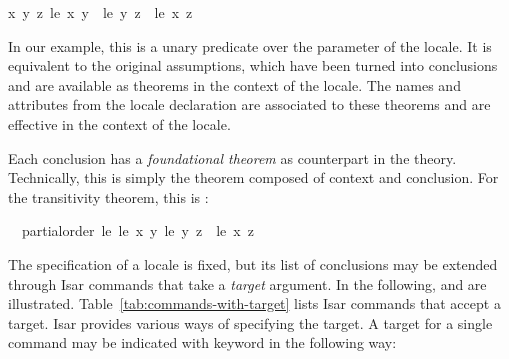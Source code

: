 \begin{isabellebody}
\begin{isamarkuptext}
\begin{isabelle}
x\ y\ z{}\ {}le\ x\ y\ {}\ {}le\ y\ z\ {}\ {}le\ x\ z{}%
\end{isabelle}
  In our example, this is a unary predicate over the parameter of the
  locale.  It is equivalent to the original assumptions, which have
  been turned into conclusions and are
  available as theorems in the context of the locale.  The names and
  attributes from the locale declaration are associated to these
  theorems and are effective in the context of the locale.

  Each conclusion has a \emph{foundational theorem} as counterpart
  in the theory.  Technically, this is simply the theorem composed
  of context and conclusion.  For the transitivity theorem, this is
  :
  \begin{isabelle}%
\ \ {}partial{}order\ {}le{}\ {}le\ {}x\ {}y{}\ {}le\ {}y\ {}z{}\ {}\ {}le\ {}x\ {}z%
\end{isabelle}%
\end{isamarkuptext}%
\isamarkuptrue%
%
\isamarkuptrue%
%
\begin{isamarkuptext}%
The specification of a locale is fixed, but its list of conclusions
  may be extended through Isar commands that take a \emph{target} argument.
  In the following,  and 
   are illustrated.
  Table~\ref{tab:commands-with-target} lists Isar commands that accept
  a target.  Isar provides various ways of specifying the target.  A
  target for a single command may be indicated with keyword
   in the following way:


\end{isamarkuptext}
\end{isabellebody}
